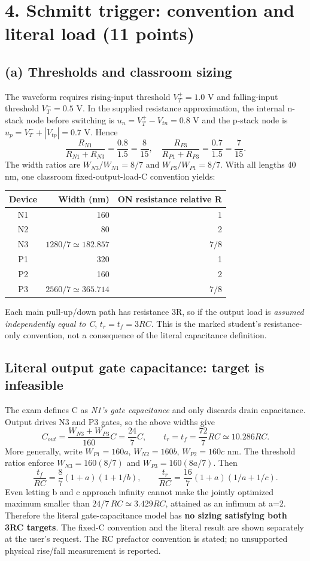 \documentclass[10pt]{article}
\begin{document}
\newpage\section*{4. Schmitt trigger: convention and literal load (11 points)}
\subsection*{(a) Thresholds and classroom sizing}
The waveform requires rising-input threshold $V_T^+=1.0$ V and falling-input threshold $V_T^-=0.5$ V. In the supplied resistance approximation, the internal n-stack node before switching is $u_n=V_T^+-V_{tn}=0.8$ V and the p-stack node is $u_p=V_T^-+|V_{tp}|=0.7$ V. Hence
\[
\frac{R_{N1}}{R_{N1}+R_{N3}}=\frac{0.8}{1.5}=\frac8{15},\quad
\frac{R_{P3}}{R_{P1}+R_{P3}}=\frac{0.7}{1.5}=\frac7{15}.
\]
The width ratios are $W_{N3}/W_{N1}=8/7$ and $W_{P3}/W_{P1}=8/7$. With all lengths 40 nm, one classroom fixed-output-load-C convention yields:
\begin{center}\begin{tabular}{crr}\toprule Device&Width (nm)&ON resistance relative R\\\midrule
N1&160&1\\N2&80&2\\N3&$1280/7\simeq182.857$&$7/8$\\
P1&320&1\\P2&160&2\\P3&$2560/7\simeq365.714$&$7/8$\\\bottomrule\end{tabular}\end{center}
Each main pull-up/down path has resistance 3R, so if the output load is \emph{assumed independently equal to C}, $t_r=t_f=3RC$. This is the marked student's resistance-only convention, not a consequence of the literal capacitance definition.

\subsection*{Literal output gate capacitance: target is infeasible}
The exam defines C as \emph{N1's gate capacitance} and only discards drain capacitance. Output drives N3 and P3 gates, so the above widths give
\[C_{out}=\frac{W_{N3}+W_{P3}}{160}C=\frac{24}{7}C,
\qquad t_r=t_f=\frac{72}{7}RC\simeq10.286RC.\]
More generally, write $W_{P1}=160a$, $W_{N2}=160b$, $W_{P2}=160c$ nm. The threshold ratios enforce $W_{N3}=160(8/7)$ and $W_{P3}=160(8a/7)$. Then
\[
\frac{t_f}{RC}=\frac8{7}(1+a)(1+1/b),\qquad
\frac{t_r}{RC}=\frac{16}{7}(1+a)(1/a+1/c).
\]
Even letting b and c approach infinity cannot make the jointly optimized maximum smaller than $24/7\,RC\simeq3.429RC$, attained as an infimum at a=2. Therefore the literal gate-capacitance model has \textbf{no sizing satisfying both 3RC targets}. The fixed-C convention and the literal result are shown separately at the user's request. The RC prefactor convention is stated; no unsupported physical rise/fall measurement is reported.
\end{document}
